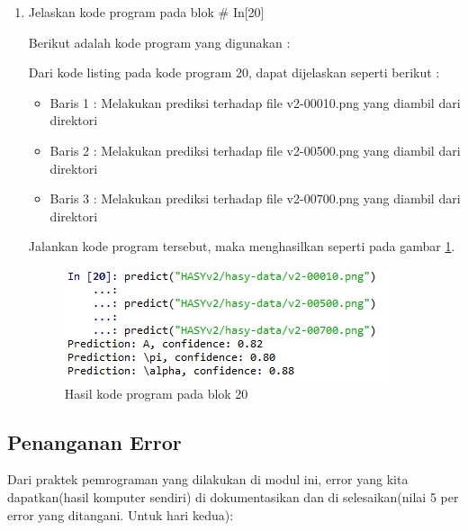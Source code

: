 \begin{enumerate}
\item Jelaskan kode program pada blok \# In[20]
	\par Berikut adalah kode program yang digunakan :
	
	\par Dari kode listing pada kode program 20, dapat dijelaskan seperti berikut :
	\begin{itemize}
	\item Baris 1	: Melakukan prediksi terhadap file v2-00010.png yang diambil dari direktori
	\item Baris 2	: Melakukan prediksi terhadap file v2-00500.png yang diambil dari direktori
	\item Baris 3	: Melakukan prediksi terhadap file v2-00700.png yang diambil dari direktori
	\end{itemize}
	\par Jalankan kode program tersebut, maka menghasilkan seperti pada gambar \ref{andri20}.
		\begin{figure}[!hbtp]
		\centering
		\includegraphics[scale=0.5]{figures/chapter7/andri20.jpg}
		\caption{Hasil kode program pada blok 20}
		\label{andri20}
		\end{figure}

\end{enumerate}


\subsection{Penanganan Error}
Dari praktek pemrograman yang dilakukan di modul ini, error yang kita dapatkan(hasil komputer sendiri) di dokumentasikan dan di selesaikan(nilai 5 per error yang ditangani. Untuk hari kedua):

